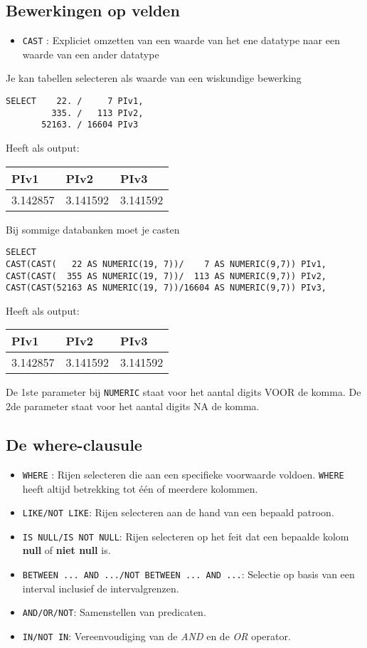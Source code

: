 \documentclass[12pt]{report}
\newcommand{\sepline}{ \noindent{\rule{\linewidth}{0.4pt}}}
\begin{document}
\subsection{Bewerkingen op velden}
\begin{itemize}
 \item \texttt{CAST} : Expliciet omzetten van een waarde van het ene datatype naar een waarde van een ander datatype
\end{itemize}

\sepline

Je kan tabellen selecteren als waarde van een wiskundige bewerking
\begin{verbatim}
SELECT    22. /     7 PIv1,
         335. /   113 PIv2,
       52163. / 16604 PIv3
\end{verbatim}
Heeft als output:
\begin{tabular}{lll}
  PIv1 & PIv2 & PIv3 \\
  \hline
  3.142857 & 3.141592 & 3.141592
\end{tabular}

\sepline


Bij sommige databanken moet je casten
\begin{verbatim}
SELECT 
CAST(CAST(   22 AS NUMERIC(19, 7))/    7 AS NUMERIC(9,7)) PIv1,
CAST(CAST(  355 AS NUMERIC(19, 7))/  113 AS NUMERIC(9,7)) PIv2,
CAST(CAST(52163 AS NUMERIC(19, 7))/16604 AS NUMERIC(9,7)) PIv3,
\end{verbatim}
Heeft als output:
\begin{tabular}{lll}
  PIv1 & PIv2 & PIv3 \\
  \hline
  3.142857 & 3.141592 & 3.141592
\end{tabular}

De 1ste parameter bij \texttt{NUMERIC} staat voor het aantal digits VOOR de komma. De 2de parameter staat voor het aantal digits 
NA de komma. 

\sepline

\subsection{De where-clausule}
\begin{itemize}
 \item \texttt{WHERE} : Rijen selecteren die aan een specifieke voorwaarde voldoen. \texttt{WHERE} heeft altijd betrekking
 tot één of meerdere kolommen.
 \item \texttt{LIKE/NOT LIKE}: Rijen selecteren aan de hand van een bepaald patroon.
 \item \texttt{IS NULL/IS NOT NULL}: Rijen selecteren op het feit dat een bepaalde kolom \textbf{null} of \textbf{niet null} is.
 \item \texttt{BETWEEN ... AND .../NOT BETWEEN ... AND ...}: Selectie op basis van een interval inclusief de intervalgrenzen.
 \item \texttt{AND/OR/NOT}: Samenstellen van predicaten.
 \item \texttt{IN/NOT IN}: Vereenvoudiging van de \textit{AND} en de \textit{OR} operator.
 \end{itemize}
\end{document}
